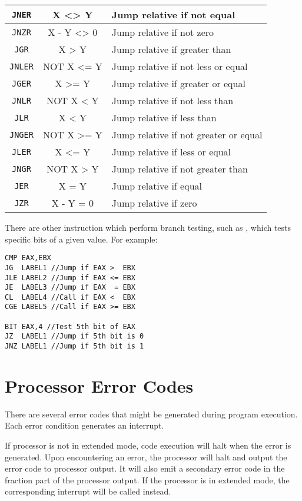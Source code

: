 \begin{longtable}{|c|c|p{3.0in}|}
\texttt{JNER}   & X <> Y     & Jump relative if not equal \\ \hline
\texttt{JNZR}   & X - Y <> 0 & Jump relative if not zero \\ \hline
\texttt{JGR}    & X > Y      & Jump relative if greater than \\ \hline
\texttt{JNLER}  & NOT X <= Y & Jump relative if not less or equal \\ \hline
\texttt{JGER}   & X >= Y     & Jump relative if greater or equal \\ \hline
\texttt{JNLR}   & NOT X < Y  & Jump relative if not less than\\ \hline
\texttt{JLR}    & X < Y      & Jump relative if less than \\ \hline
\texttt{JNGER}  & NOT X >= Y & Jump relative if not greater or equal \\ \hline
\texttt{JLER}   & X <= Y     & Jump relative if less or equal\\ \hline
\texttt{JNGR}   & NOT X > Y  & Jump relative if not greater than \\ \hline
\texttt{JER}    & X = Y      & Jump relative if equal \\ \hline
\texttt{JZR}    & X - Y = 0  & Jump relative if zero \\ \hline

\end{longtable}
\onehalfspacing

There are other instruction which perform branch testing, such as , which tests specific bits of a given value. For example: \label{branchbit}

\begin{verbatim}
CMP EAX,EBX
JG  LABEL1 //Jump if EAX >  EBX
JLE LABEL2 //Jump if EAX <= EBX
JE  LABEL3 //Jump if EAX  = EBX
CL  LABEL4 //Call if EAX <  EBX
CGE LABEL5 //Call if EAX >= EBX

BIT EAX,4 //Test 5th bit of EAX
JZ  LABEL1 //Jump if 5th bit is 0
JNZ LABEL1 //Jump if 5th bit is 1
\end{verbatim}

\section{Processor Error Codes}\label{errorcodes}
There are several error codes that might be generated during program execution. Each error condition generates an interrupt.

If processor is not in extended mode, code execution will halt when the error is generated. Upon encountering an error, the processor will halt and output the error code to  processor output. It will also emit a secondary error code in the fraction part of the  processor output. If the processor is in extended mode, the corresponding interrupt will be called instead.

